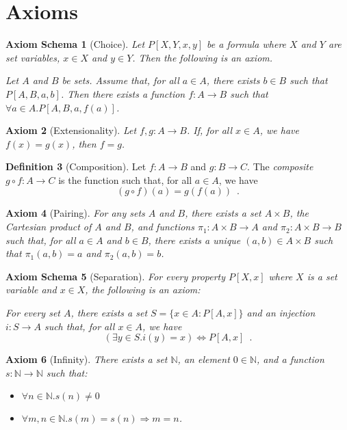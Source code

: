 \documentclass{book}
\newtheorem{ax}{Axiom}[section]
\newtheorem{axs}[ax]{Axiom Schema}
\theoremstyle{definition}
\newtheorem{df}[ax]{Definition}
\begin{document}
\section{Axioms} %

\begin{axs}[Choice]
Let $P[X,Y,x,y]$ be a formula where $X$ and $Y$ are set variables, $x \in X$ and $y \in Y$. Then the following is an axiom.

Let $A$ and $B$ be sets. Assume that, for all $a \in A$, there exists $b \in B$ such that $P[A,B,a,b]$. Then there exists a function $f : A \rightarrow B$ such that $\forall a \in A. P[A,B,a,f(a)]$.
\end{axs}

\begin{ax}[Extensionality]
Let $f, g : A \rightarrow B$. If, for all $x \in A$, we have $f(x) = g(x)$, then $f = g$.
\end{ax}

\begin{df}[Composition]
Let $f : A \rightarrow B$ and $g : B \rightarrow C$. The \emph{composite} $g \circ f : A \rightarrow C$ is the function such that, for all $a \in A$, we have
\[ (g \circ f)(a) = g(f(a)) \enspace . \]
\end{df}

\begin{ax}[Pairing]
For any sets $A$ and $B$, there exists a set $A \times B$, the \emph{Cartesian product} of $A$ and $B$, and functions $\pi_1 : A \times B \rightarrow A$ and $\pi_2 : A \times B \rightarrow B$ such that, for all $a \in A$ and $b \in B$, there exists a unique $(a,b) \in A \times B$ such that $\pi_1(a,b) = a$ and $\pi_2(a,b) = b$.
\end{ax}

\begin{axs}[Separation]
For every property $P[X,x]$ where $X$ is a set variable and $x \in X$, the following is an axiom:

For every set $A$, there exists a set $S = \{ x \in A : P[A,x] \}$ and an injection $i : S \rightarrow A$ such that, for all $x \in A$, we have
\[ (\exists y \in S. i(y) = x) \Leftrightarrow P[A,x] \enspace . \]
\end{axs}

\begin{ax}[Infinity]
There exists a set $\mathbb{N}$, an element $0 \in \mathbb{N}$, and a function $s : \mathbb{N} \rightarrow \mathbb{N}$ such that:
\begin{itemize}
\item $\forall n \in \mathbb{N}. s(n) \neq 0$
\item $\forall m,n \in \mathbb{N}. s(m) = s(n) \Rightarrow m = n$.
\end{itemize}
\end{ax}
\end{document}

